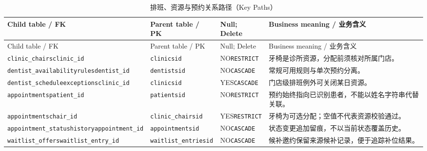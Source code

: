 \begingroup\footnotesize\setlength{\tabcolsep}{3pt}
\begin{longtable}{@{}L{43mm}L{32mm}L{24mm}L{49mm}@{}}
\caption{排班、资源与预约关系路径（Key Paths）}\label{tab:domain-key-05}\\\toprule
Child table / FK & Parent table / PK & Null; Delete & Business meaning / 业务含义\\\midrule\endfirsthead
\toprule Child table / FK & Parent table / PK & Null; Delete & Business meaning / 业务含义\\\midrule\endhead
\texttt{clinic\_chairs}\newline\texttt{clinic\_id} & \texttt{clinics}\newline\texttt{id} & NO\newline\texttt{RESTRICT} & 牙椅是诊所资源，分配前须核对所属门店。\\
\texttt{dentist\_availability}\newline\texttt{rules}\newline\texttt{dentist\_id} & \texttt{dentists}\newline\texttt{id} & NO\newline\texttt{CASCADE} & 常规可用规则与单次预约分离。\\
\texttt{dentist\_schedule}\newline\texttt{exceptions}\newline\texttt{clinic\_id} & \texttt{clinics}\newline\texttt{id} & YES\newline\texttt{CASCADE} & 门店级排班例外可关闭某日资源。\\
\texttt{appointments}\newline\texttt{patient\_id} & \texttt{patients}\newline\texttt{id} & NO\newline\texttt{RESTRICT} & 预约始终指向已识别患者，不能以姓名字符串代替关联。\\
\texttt{appointments}\newline\texttt{chair\_id} & \texttt{clinic\_chairs}\newline\texttt{id} & YES\newline\texttt{RESTRICT} & 牙椅为可选分配；空值不代表资源校验通过。\\
\texttt{appointment\_status}\newline\texttt{history}\newline\texttt{appointment\_id} & \texttt{appointments}\newline\texttt{id} & NO\newline\texttt{CASCADE} & 状态变更追加留痕，不以当前状态覆盖历史。\\
\texttt{waitlist\_offers}\newline\texttt{waitlist\_entry\_id} & \texttt{waitlist\_entries}\newline\texttt{id} & NO\newline\texttt{CASCADE} & 候补邀约保留来源候补记录，便于追踪补位结果。\\
\bottomrule\end{longtable}\endgroup



